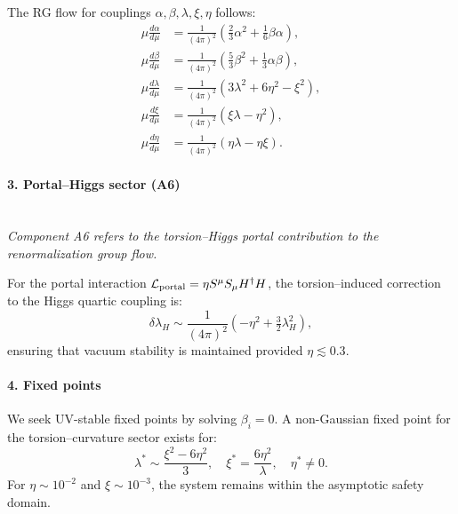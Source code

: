 \documentclass{article}
\begin{document}
The RG flow for couplings \( \alpha, \beta, \lambda, \xi, \eta \) follows:
\begin{equation}\label{eq:auto85}
\begin{aligned}
  \mu\frac{d\alpha}{d\mu} &= \frac{1}{(4\pi)^2} \left( \tfrac{2}{3} \alpha^2 + \tfrac{1}{6} \beta \alpha \right),\\
  \mu\frac{d\beta}{d\mu}  &= \frac{1}{(4\pi)^2} \left( \tfrac{5}{3} \beta^2 + \tfrac{1}{3} \alpha \beta \right),\\
  \mu\frac{d\lambda}{d\mu} &= \frac{1}{(4\pi)^2} \left( 3\lambda^2 + 6\eta^2 - \xi^2 \right),\\
  \mu\frac{d\xi}{d\mu} &= \frac{1}{(4\pi)^2} \left( \xi \lambda - \eta^2 \right),\\
  \mu\frac{d\eta}{d\mu} &= \frac{1}{(4\pi)^2} \left( \eta \lambda - \eta \xi \right).
\end{aligned}
\end{equation}

\paragraph{3. Portal–Higgs sector (A6)} \hfill\\
\textit{Component A6 refers to the torsion–Higgs portal contribution to the renormalization group flow.}



For the portal interaction \( \mathcal{L}_{\rm portal} = \eta S^\mu S_\mu H^\dagger H \), the torsion–induced correction to the Higgs quartic coupling is:
\begin{equation}\label{eq:auto86}
\delta \lambda_H \sim \frac{1}{(4\pi)^2} \left( -\eta^2 + \tfrac{3}{2} \lambda_H^2 \right),
\end{equation}
ensuring that vacuum stability is maintained provided \( \eta \lesssim 0.3 \).

\paragraph{4. Fixed points}

We seek UV-stable fixed points by solving \( \beta_i = 0 \). A non-Gaussian fixed point for the torsion–curvature sector exists for:
\begin{equation}\label{eq:auto87}
\lambda^* \sim \frac{\xi^2 - 6\eta^2}{3}, \quad
\xi^* = \frac{6\eta^2}{\lambda}, \quad
\eta^* \neq 0.
\end{equation}
For \( \eta \sim 10^{-2} \) and \( \xi \sim 10^{-3} \), the system remains within the asymptotic safety domain.
\end{document}
